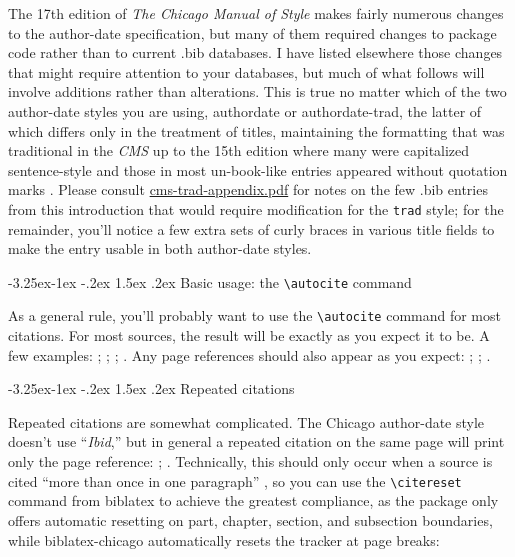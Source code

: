 \documentclass[a4paper,12pt]{article}
\makeatletter
\newcommand{\cmd}[1]{\texttt{\textbackslash #1}}
\renewcommand{\section}{\@startsection{section}{1}{\z@}%
                                     {-3.25ex\@plus -1ex \@minus -.2ex}%
                                     {1.5ex \@plus .2ex}%
                                     {\normalfont\large\bfseries}}
\makeatother
\begin{document}
The 17th edition of \emph{The Chicago Manual of Style} makes fairly
numerous changes to the author-date specification, but many of them
required changes to package code rather than to current .bib
databases.  I have  listed elsewhere those
changes that might require attention to your databases, but much of
what follows will involve additions rather than alterations.  This is
true no matter which of the two author-date styles you are using,
\textsf{authordate} or \textsf{authordate-trad}, the latter of which
differs only in the treatment of titles, maintaining the formatting
that was traditional in the \emph{CMS} up to the 15th edition where
many were capitalized sentence-style and those in most un-book-like
entries appeared without quotation marks
\autocite[15.38]{chicago:manual}.  Please consult
\href{file:cms-trad-appendix.pdf}{\textsf{cms-trad-appendix.pdf}} for
notes on the few .bib entries from this introduction that would
require modification for the \texttt{trad} style; for the remainder,
you'll notice a few extra sets of curly braces in various
\textsf{title} fields to make the entry usable in both author-date
styles.

\section{Basic usage: the \cmd{autocite} command}
\label{usage}

As a general rule, you'll probably want to use the \cmd{autocite}
command for most citations.  For most sources, the result will be
exactly as you expect it to be.  A few examples:
\autocite{adorno:benj}; \autocite{ashbrook:brain};
\autocite{babb:peru}; \autocite{barcott:review}.  Any page references
should also appear as you expect: \autocite[338]{batson};
\autocite[79]{beattie:crime}; \autocite[36]{boxer:china}.

\section{Repeated citations}
\label{sec:ibidem}

Repeated citations are somewhat complicated.  The Chicago author-date
style doesn't use \enquote{\emph{Ibid},} but in general a repeated
citation on the same page will print only the page reference:
\autocite{browning:aurora}; \autocite[45]{browning:aurora}.
Technically, this should only occur when a source is cited
\enquote{more than once in one paragraph}
\autocite[15.27]{chicago:manual}, so you can use the \cmd{citereset}
command from \textsf{biblatex} to achieve the greatest compliance, as
the package only offers automatic resetting on part, chapter, section,
and subsection boundaries, while \textsf{biblatex-chicago}
automatically resets the tracker at page breaks:
\end{document}
